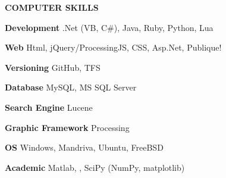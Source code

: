 \documentclass[11pt]{article}
\begin{document}
\hspace{-.29in}
 {\bf  COMPUTER SKILLS }
 \begin{list}{name}{ 18em \leftmargin 1.33in \itemsep -.025in }
\item [\textbf{Development}] {.Net (VB, C\#), Java, Ruby, Python, Lua} 
\item [\textbf{Web}] {Html, jQuery/ProcessingJS, CSS, Asp.Net, Publique!} 
\item [\textbf{Versioning}] {GitHub, TFS} 
\item [\textbf{Database}] {MySQL, MS SQL Server} 
\item [\textbf{Search Engine}] {Lucene} 
\item [\textbf{Graphic Framework}] {Processing} 
\item [\textbf{OS}] {Windows, Mandriva, Ubuntu, FreeBSD} 
\item [\textbf{Academic}] {Matlab, \LaTeXe, SciPy (NumPy, matplotlib)} 
\end{list}

\hfill		
\end{document}
